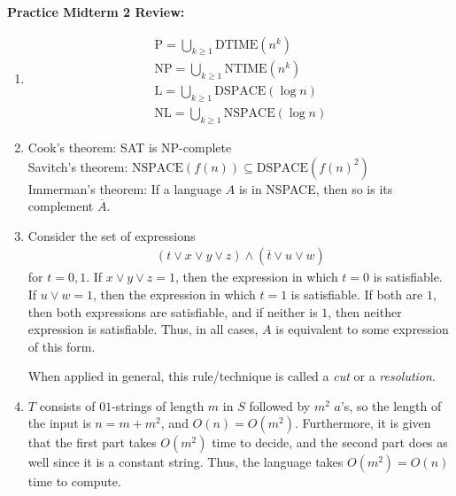 \documentclass[a4paper,12pt]{article}
\theoremstyle{remark}
\theoremstyle{definition}
\begin{document}
\textbf{Practice Midterm 2 Review:}
\begin{enumerate}
    \item
        \begin{gather*}
            \text{P} = \bigcup_{k \geq 1} \text{DTIME}(n^k) \\
            \text{NP} = \bigcup_{k \geq 1} \text{NTIME}(n^k) \\
            \text{L} = \bigcup_{k \geq 1} \text{DSPACE}(\log n) \\
            \text{NL} = \bigcup_{k \geq 1} \text{NSPACE}(\log n)
        \end{gather*}
    \item
        Cook's theorem: SAT is NP-complete \\
        Savitch's theorem: $\text{NSPACE}(f(n)) \subseteq \text{DSPACE}\left( f(n)^2 \right)$ \\
        Immerman's theorem: If a language $A$ is in NSPACE, then so is its complement $\overline{A}$.
    \item
        Consider the set of expressions
        \begin{align*}
            (t \lor x \lor y \lor z) \land (\overline{t} \lor u \lor w)
        \end{align*}
        for $t = 0, 1$. If $x \lor y \lor z = 1$, then the expression in which $t = 0$ is satisfiable. If $u \lor w = 1$, then the expression in which $t = 1$ is satisfiable. If both are $1$, then both expressions are satisfiable, and if neither is $1$, then neither expression is satisfiable. Thus, in all cases, $A$ is equivalent to some expression of this form. \par
        When applied in general, this rule/technique is called a \emph{cut} or a \emph{resolution}.
    \item
        $T$ consists of $01$-strings of length $m$ in $S$ followed by $m^2$ $a$'s, so the length of the input is $n = m + m^2$, and $O(n) = O(m^2)$. Furthermore, it is given that the first part takes $O(m^2)$ time to decide, and the second part does as well since it is a constant string. Thus, the language takes $O(m^2) = O(n)$ time to compute.
\end{enumerate}
\end{document}

